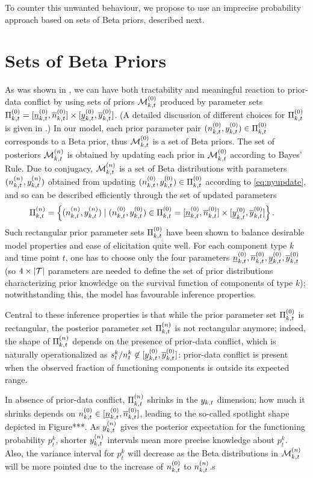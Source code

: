 \documentclass[authoryear, 12pt, a4paper]{elsarticle}
\begin{document}
To counter this unwanted behaviour,
we propose to use an imprecise probability approach
based on sets of Beta priors, described next.


\section{Sets of Beta Priors}

As was shown in \citet{2009:WalterAugustin}, %
we can have both tractability and meaningful reaction to prior-data conflict
by using sets of priors $\mathcal{M}^{(0)}_{k,t}$ produced by parameter sets $\Pi^{(0)}_{k,t} = [\underline{n}^{(0)}_{k,t}, \overline{n}^{(0)}_{k,t}] \times [\underline{y}^{(0)}_{k,t}, \overline{y}^{(0)}_{k,t}]$. 
(A detailed discussion of different choices for $\Pi^{(0)}_{k,t}$ is given in \citet[\S 3.1]{2013:diss-gw}.)
In our model, each prior parameter pair $(n^{(0)}_{k,t}, y^{(0)}_{k,t}) \in \Pi^{(0)}_{k,t}$
corresponds to a Beta prior, thus $\mathcal{M}^{(0)}_{k,t}$ is a set of Beta priors.
The set of posteriors $\mathcal{M}^{(n)}_{k,t}$ is obtained by updating each prior in $\mathcal{M}^{(0)}_{k,t}$ according to Bayes' Rule.
Due to conjugacy, $\mathcal{M}^{(n)}_{k,t}$ is a set of Beta distributions with parameters $(n^{(n)}_{k,t}, y^{(n)}_{k,t})$
obtained from updating $(n^{(0)}_{k,t}, y^{(0)}_{k,t}) \in \Pi^{(0)}_{k,t}$ according to \eqref{eq:nyupdate},
and so can be described efficiently through the set of updated parameters
\begin{align*}
\Pi^{(n)}_{k,t} &= \Big\{ (n^{(n)}_{k,t}, y^{(n)}_{k,t}) \mid (n^{(0)}_{k,t}, y^{(0)}_{k,t}) \in \Pi^{(0)}_{k,t} = [\underline{n}^{(0)}_{k,t}, \overline{n}^{(0)}_{k,t}] \times [\underline{y}^{(0)}_{k,t}, \overline{y}^{(0)}_{k,t}] \Big\}\,.
\end{align*}
Such rectangular prior parameter sets $\Pi^{(0)}_{k,t}$ have been shown
to balance desirable model properties and ease of elicitation quite well.
%
For each component type $k$ and time point $t$,
one has to choose only the four parameters $\underline{n}^{(0)}_{k,t}, \overline{n}^{(0)}_{k,t}, \underline{y}^{(0)}_{k,t}, \overline{y}^{(0)}_{k,t}$
(so $4 \times |{\cal T}|$ parameters are needed to define the set of prior distributions characterizing
prior knowledge on the survival function of components of type $k$);
notwithstanding this, the model has favourable inference properties.

Central to these inference properties is that
while the prior parameter set $\Pi^{(0)}_{k,t}$ is rectangular,
the posterior parameter set $\Pi^{(n)}_{k,t}$ is not rectangular anymore;
indeed, the shape of $\Pi^{(n)}_{k,t}$ depends on the presence of prior-data conflict,
which is naturally operationalized as $s^k_t/n^k_t \not\in [\underline{y}^{(0)}_{k,t}, \overline{y}^{(0)}_{k,t}]$:
prior-data conflict is present when the observed fraction of functioning components
is outside its expected range.

In absence of prior-data conflict, 
$\Pi^{(n)}_{k,t}$ shrinks in the $y_{k,t}$ dimension;
how much it shrinks depends on $n^{(0)}_{k,t} \in [\underline{n}^{(0)}_{k,t}, \overline{n}^{(0)}_{k,t}]$,
leading to the so-called spotlight shape depicted in Figure***.
As $y^{(n)}_{k,t}$ gives the posterior expectation for the functioning probability $p_t^k$,
shorter $y^{(n)}_{k,t}$ intervals mean more precise knowledge about $p_t^k$.
Also, the variance interval for $p_t^k$ will decrease
as the Beta distributions in $\mathcal{M}^{(n)}_{k,t}$ will be more pointed
due to the increase of $n^{(0)}_{k,t}$ to $n^{(n)}_{k,t}$.s
\end{document}
